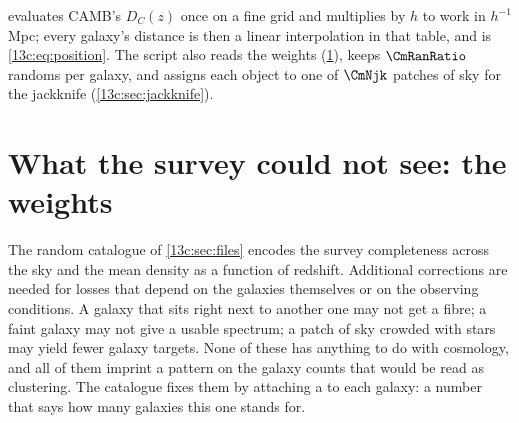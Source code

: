 
 evaluates CAMB's $D_C(z)$ once on a fine grid and
multiplies by $h$ to work in $h^{-1}$Mpc; every galaxy's distance is then a linear
interpolation in that table, and  is \eqref{13c:eq:position}. The
script also reads the weights (\cref{13c:sec:weights}), keeps $\CmRanRatio$ randoms
per galaxy, and assigns each object to one of $\CmNjk$ patches of sky for the jackknife
(\cref{13c:sec:jackknife}).
\section{What the survey could not see: the weights}
\label{13c:sec:weights}

The random catalogue of \cref{13c:sec:files} encodes the survey completeness
across the sky and the mean density as a function of redshift. Additional
corrections are needed for losses that depend on the galaxies themselves or
on the observing conditions. A galaxy that sits right next to another one may
not get a fibre; a faint galaxy may not give a usable spectrum; a patch of sky
crowded with stars may yield fewer galaxy targets. None of these has anything to do
with cosmology, and all of them imprint a pattern on the galaxy counts that would be
read as clustering. The catalogue fixes them by attaching a  to each
galaxy: a number that says how many galaxies this one stands for.

